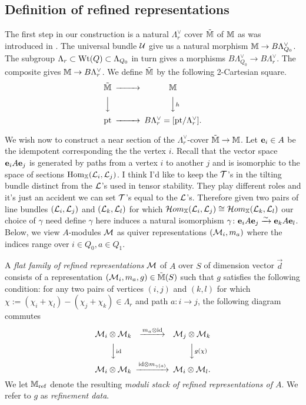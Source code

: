 \documentclass[12pt]{amsart}
\newcommand{\Wt}{\textup{Wt}}
\begin{document}
\subsection{Definition of refined representations}
The first step in our construction is a natural $\Lambda_r^\vee$ cover $\tilde{\mathbb{M}}$ of $\mathbb{M}$ as was introduced in \cite{Abd}.
The universal bundle $\mathcal{U}$ give us a natural morphism $\mathbb{M} \rightarrow B\Lambda_{Q_0}^\vee$.
The subgroup $\Lambda_r \subset \Wt(Q) \subset \Lambda_{Q_0}$ in turn gives a morphisms $B\Lambda_{Q_0}^\vee \rightarrow B\Lambda_r^\vee$.
The composite gives $\mathbb{M} \rightarrow B\Lambda_r^\vee$.
We define $\tilde{\mathbb{M}}$ by the following 2-Cartesian square.
\begin{equation*}
\begin{CD}
\tilde{\bM} @>>> \bM \\
@VVV @VVhV \\
\text{pt} @>>> B\Lambda_r^{\vee} = [\text{pt}/\Lambda_r^{\vee}].
\end{CD}
\end{equation*}

We wish now to construct a near section of the $\Lambda_r^{\vee}$-cover $\tilde{\mathbb{M}} \rightarrow \mathbb{M}$. 
Let $\mathbf{e}_i \in A$ be the idempotent corresponding the the vertex $i$. 
Recall that the vector space $\mathbf{e}_i A \mathbf{e}_j$ is generated by paths from a vertex $i$ to another $j$ and is isomorphic to the space of sections $\operatorname{Hom}_{\mathbb{X}} (\mathcal{L}_i, \mathcal{L}_j)$. {\red I think I'd like to keep the $\mathcal{T}$'s in the tilting bundle distinct from the $\mathcal{L}$'s used in tensor stability. They play different roles and it's just an accident we can set $\mathcal{T}$'s equal to the $\mathcal{L}$'s.}
Therefore given two pairs of line bundles $(\mathcal{L}_i, \mathcal{L}_j)$ and $(\mathcal{L}_k, \mathcal{L}_l)$ for which $\mathop{{\mathcal{H}}om}\nolimits_{\mathbb{X}}(\mathcal{L}_i, \mathcal{L}_j) \cong \mathop{{\mathcal{H}}om}\nolimits_{\mathbb{X}}(\mathcal{L}_k, \mathcal{L}_l)$ our choice of $\gamma$ {\red need define $\gamma$ here} induces a natural isomorphism $\gamma \colon \mathbf{e}_i A \mathbf{e}_j \xrightarrow{\sim} \mathbf{e}_k A \mathbf{e}_l$.
Below, we view $A$-modules $\mathcal{M}$ as quiver representations $(\mathcal{M}_i,m_a)$ where the indices range over $i \in Q_0, a \in Q_1$. 

\begin{definition} \label{def:refined}
A {\em flat family of refined representations} $\mathcal{M}$ of $A$ over $S$ of dimension vector $\vec{d}$ consists of a representation $(\mathcal{M}_i, m_a, g) \in \tilde{\mathbb{M}}(S)$ such that $g$ satisfies the following condition: for any two pairs of vertices $(i,j)$ and $(k,l)$ for which $\chi:= (\chi_i + \chi_l)-(\chi_j + \chi_k) \in \Lambda_r$ and path $a \colon i \rightarrow j$, the following diagram commutes
\begin{equation}  \label{eqn:refined}
\begin{CD}
\cM_i \otimes \cM_k @>m_a \otimes \text{id}>> \cM_j \otimes \cM_k\\
@VV\text{id}V @VVg(\chi)V\\
\cM_i \otimes \cM_k @>\text{id} \otimes m_{\gamma(a)}>> \cM_i \otimes \cM_l.
\end{CD}
\end{equation}
We let $\mathbb{M}_{\text{ref}}$ denote the resulting {\em moduli stack of refined representations of $A$}. We refer to $g$ as {\em refinement data}. 
\end{definition}
\end{document}
